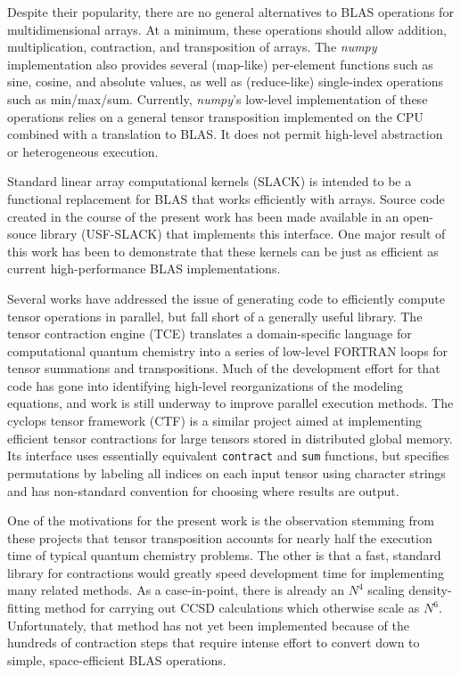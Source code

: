 \documentclass{sigplanconf}
\begin{document}
  Despite their popularity, there are no general alternatives to BLAS operations for multidimensional
arrays.  At a minimum, these operations should allow addition, multiplication, contraction,
and transposition of arrays.  The {\em numpy} implementation also provides
several (map-like) per-element functions such as sine, cosine, and absolute values,
as well as (reduce-like) single-index operations such as min/max/sum.
Currently, {\em numpy}'s low-level implementation of these operations relies on a general
tensor transposition implemented on the CPU combined with a translation to BLAS.
It does not permit high-level abstraction or heterogeneous execution.

  Standard linear array computational kernels (SLACK) is intended to be a functional
replacement for BLAS that works efficiently with arrays.
Source code created in the course of the present work has been
made available in an open-souce library (USF-SLACK) that implements
this interface.  One major result of this work has been to demonstrate
that these kernels can be just as efficient as current high-performance
BLAS implementations.

  Several works have addressed the issue of generating code to efficiently
compute tensor operations in parallel, but fall short of a generally useful library.
The tensor contraction engine (TCE) translates
a domain-specific language for computational quantum chemistry
into a series of low-level FORTRAN loops for tensor
summations and transpositions.\cite{tce}  Much of the development effort for that
code has gone into identifying high-level reorganizations of the modeling equations,
and work is still underway to improve parallel execution methods.\cite{eapra15}
The cyclops tensor framework (CTF)\cite{ctf} is a similar project aimed at
implementing efficient tensor contractions for large tensors stored
in distributed global memory.  Its interface uses essentially equivalent {\tt contract} and {\tt sum}
functions, but specifies permutations by labeling all indices on each input tensor
using character strings and has non-standard
convention for choosing where results are output.

  One of the motivations for the present work is the observation stemming from these projects
that tensor transposition accounts for nearly half the execution
time of typical quantum chemistry problems.\cite{spaghetty}
The other is that a fast, standard library for contractions would greatly speed development
time for implementing many related methods.  As a case-in-point, there is already an 
$N^4$ scaling density-fitting method for carrying out CCSD
calculations which otherwise scale as $N^6$.\cite{ehohe12}
Unfortunately, that method has not yet been implemented because of the hundreds
of contraction steps that require intense effort to convert
down to simple, space-efficient BLAS operations.\cite{edepr14}
\end{document}
